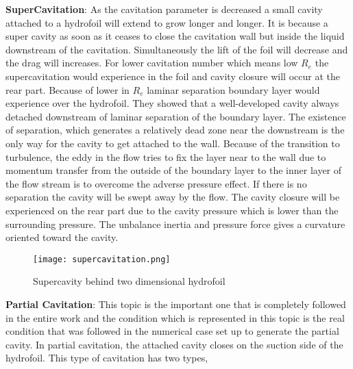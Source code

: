 \textbf{SuperCavitation}: As the cavitation parameter is decreased a
small cavity attached to a hydrofoil will extend to grow longer and
longer. It is because a super cavity as soon as it ceases to close the
cavitation wall but inside the liquid downstream of the
cavitation. Simultaneously the lift of the foil will decrease and the
drag will increases. For lower cavitation number which means low $R_e$
the supercavitation would experience in the foil and cavity closure
will occur at the rear part. Because of lower in $R_e$ laminar
separation boundary layer would experience over the hydrofoil. They
showed that a well-developed cavity always detached downstream of
laminar separation of the boundary layer. The existence of separation,
which generates a relatively dead zone near the downstream is the only
way for the cavity to get attached to the wall. Because of the
transition to turbulence, the eddy in the flow tries to fix the layer
near to the wall due to momentum transfer from the outside of the
boundary layer to the inner layer of the flow stream is to overcome
the adverse pressure effect. If there is no separation the cavity will
be swept away by the flow. The cavity closure will be experienced on
the rear part due to the cavity pressure which is lower than the
surrounding pressure. The unbalance inertia and pressure force gives a
curvature oriented toward the cavity.\\

\begin{figure}[H]
 \centering
 \texttt{[image: supercavitation.png]}
 \caption{Supercavity behind two dimensional hydrofoil}
  \label{fig:fig10}
\end{figure}

\textbf{Partial Cavitation}: This topic is the important one that is
completely followed in the entire work and the condition which is
represented in this topic is the real condition that was followed in
the numerical case set up to generate the partial cavity. In partial
cavitation, the attached cavity closes on the suction side of the
hydrofoil. This type of cavitation has two types,

